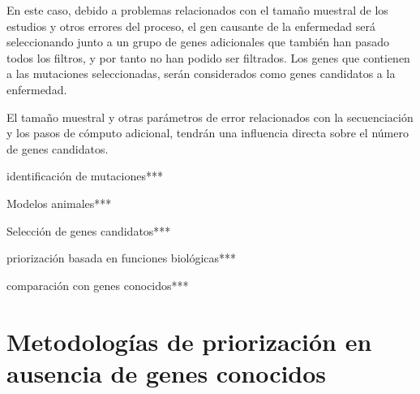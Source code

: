 En este caso, debido a problemas relacionados con el tamaño muestral de los estudios y otros errores del proceso, el gen causante de la enfermedad será seleccionando junto a un grupo de genes adicionales que también han pasado todos los filtros, y por tanto no han podido ser filtrados. Los genes que contienen a las mutaciones seleccionadas, serán considerados como genes candidatos a la enfermedad. 

El tamaño muestral y otras parámetros de error relacionados con la secuenciación y los pasos de cómputo adicional, tendrán una influencia directa sobre el número de genes candidatos. 





identificación de mutaciones***

\medskip
Modelos animales***

Selección de genes candidatos***

priorización basada en funciones biológicas***

comparación con genes conocidos***


\section{Metodologías de priorización en ausencia de genes conocidos}





